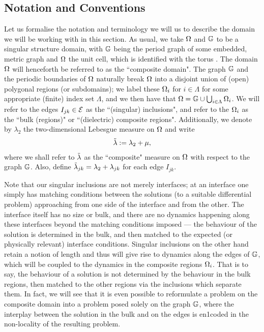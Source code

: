 \subsection{Notation and Conventions} \label{ssec:SINotation}
Let us formalise the notation and terminology we will us to describe the domain we will be working with in this section.
As usual, we take $\Omega$ and $\mathbb{G}$ to be a singular structure domain, with $\mathbb{G}$ being the period graph of some embedded, metric graph and $\Omega$ the unit cell, which is identified with the torus .
The domain $\Omega$ will henceforth be referred to as the ``composite domain".
The graph $\mathbb{G}$ and the periodic boundaries of $\Omega$ naturally break $\Omega$ into a disjoint union of (open) polygonal regions (or subdomains); we label these $\Omega_i$ for $i\in\Lambda$ for some appropriate (finite) index set $\Lambda$, and we then have that $\Omega = \mathbb{G}\cup\bigcup_{i\in\Lambda}\Omega_i$.
We will refer to the edges $I_{jk}\in\mathcal{E}$ as the ``(singular) inclusions", and refer to the $\Omega_i$ as the ``bulk (regions)" or ``(dielectric) composite regions".
Additionally, we denote by $\lambda_2$ the two-dimensional Lebesgue measure on $\Omega$ and write
\begin{align*}
	\tilde{\lambda} := \lambda_2 + \mu,
\end{align*}
where we shall refer to $\tilde{\lambda}$ as the ``composite" measure on $\Omega$ with respect to the graph $\mathbb{G}$.
Also, define $\tilde{\lambda}_{jk} = \lambda_2 + \lambda_{jk}$ for each edge $I_{jk}$.

Note that our singular inclusions are not merely interfaces; at an interface one simply has matching conditions between the solutions (to a suitable differential problem) approaching from one side of the interface and from the other.
The interface itself has no size or bulk, and there are no dynamics happening along these interfaces beyond the matching conditions imposed --- the behaviour of the solution is determined in the bulk, and then matched to the expected (or physically relevant) interface conditions.
Singular inclusions on the other hand retain a notion of length and thus will give rise to dynamics along the edges of $\mathbb{G}$, which will be coupled to the dynamics in the composite regions $\Omega_i$.
That is to say, the behaviour of a solution is not determined by the behaviour in the bulk regions, then matched to the other regions via the inclusions which separate them.
In fact, we will see that it is even possible to reformulate a problem on the composite domain into a problem posed solely on the graph $\mathbb{G}$, where the interplay between the solution in the bulk and on the edges is en1coded in the non-locality of the resulting problem.